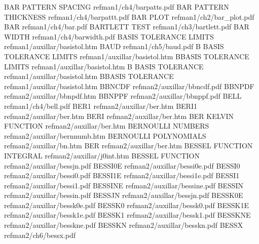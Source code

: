 BAR PATTERN SPACING                     refman1/ch4/barpatts.pdf
BAR PATTERN THICKNESS                   refman1/ch4/barpattt.pdf
BAR PLOT                                refman1/ch2/bar_plot.pdf
BAR                                     refman1/ch4/bar.pdf
BARTLETT TEST                           refman1/ch3/bartlett.pdf
BAR WIDTH                               refman1/ch4/barwidth.pdf
BASIS TOLERANCE LIMITS                  refman1/auxillar/basistol.htm
BAUD                                    refman1/ch5/baud.pdf
B BASIS TOLERANCE LIMITS                refman1/auxillar/basistol.htm
BBASIS TOLERANCE LIMITS                 refman1/auxillar/basistol.htm
B BASIS TOLERANCE                       refman1/auxillar/basistol.htm
BBASIS TOLERANCE                        refman1/auxillar/basistol.htm
BBNCDF                                  refman2/auxillar/bbncdf.pdf
BBNPDF                                  refman2/auxillar/bbnpdf.htm
BBNPPF                                  refman2/auxillar/bbnppf.pdf
BELL                                    refman1/ch4/bell.pdf
BER1                                    refman2/auxillar/ber.htm
BERI1                                   refman2/auxillar/ber.htm
BERI                                    refman2/auxillar/ber.htm
BER KELVIN FUNCTION                     refman2/auxillar/ber.htm
BERNOULLI NUMBERS                       refman2/auxillar/bernnumb.htm
BERNOULLI POLYNOMIALS                   refman2/auxillar/bn.htm
BER                                     refman2/auxillar/ber.htm
BESSEL FUNCTION INTEGRAL                refman2/auxillar/j0int.htm
BESSEL FUNCTION                         refman2/auxillar/bessjn.pdf
BESSI0E                                 refman2/auxillar/bessi0e.pdf
BESSI0                                  refman2/auxillar/bessi0.pdf
BESSI1E                                 refman2/auxillar/bessi1e.pdf
BESSI1                                  refman2/auxillar/bessi1.pdf
BESSINE                                 refman2/auxillar/bessine.pdf
BESSIN                                  refman2/auxillar/bessin.pdf
BESSJN                                  refman2/auxillar/bessjn.pdf
BESSK0E                                 refman2/auxillar/bessk0e.pdf
BESSK0                                  refman2/auxillar/bessk0.pdf
BESSK1E                                 refman2/auxillar/bessk1e.pdf
BESSK1                                  refman2/auxillar/bessk1.pdf
BESSKNE                                 refman2/auxillar/besskne.pdf
BESSKN                                  refman2/auxillar/besskn.pdf
BESSX                                   refman2/ch6/bessx.pdf
